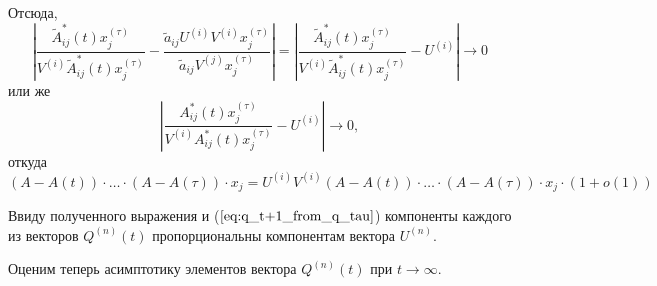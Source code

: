 \documentclass[12pt]{article}
\begin{document}
{Отсюда,
\begin{equation}
	\left| \frac{\tilde{A}^*_{ij}(t) x^{(\tau)}_j}{V^{(i)} \tilde{A}^*_{ij}(t) x^{(\tau)}_j} - \frac{\tilde{a}_{ij} U^{(i)} V^{(i)} x^{(\tau)}_j}{\tilde{a}_{ij} V^{(j)} x^{(\tau)}_j} \right| = \left| \frac{\tilde{A}^*_{ij}(t) x^{(\tau)}_j}{V^{(i)} \tilde{A}^*_{ij}(t) x^{(\tau)}_j} - U^{(i)} \right| \rightarrow 0
\end{equation}
или же
\begin{equation}
	\left| \frac{A^*_{ij}(t) x^{(\tau)}_j}{V^{(i)} A^*_{ij}(t) x^{(\tau)}_j} - U^{(i)} \right| \rightarrow 0,
\end{equation}
откуда
\begin{equation}
	(A - A(t)) \cdot \ldots \cdot (A - A(\tau)) \cdot x_j = U^{(i)} V^{(i)} (A - A(t)) \cdot \ldots \cdot (A - A(\tau)) \cdot x_j \cdot (1 + o(1))
\end{equation}

Ввиду полученного выражения и ($\ref{eq:q_t+1_from_q_tau}$) компоненты каждого из векторов $Q^{(n)}(t)$ пропорциональны компонентам вектора $U^{(n)}$.

Оценим теперь асимптотику элементов вектора $Q^{(n)}(t)$ при $t \rightarrow \infty$.

}
\end{document}
